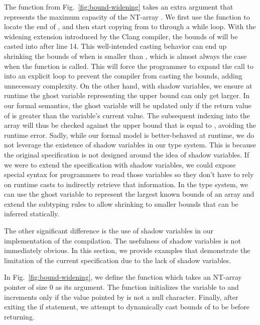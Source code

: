 The
  function from Fig.~\ref{fig:bound-widening}
 takes an extra argument  that represents the maximum capacity
 of the NT-array . We first use the  function to
 locate the end of , and then start copying from  to
  through a while loop. With the  widening
 extension introduced by the Clang \checkedc compiler, the bounds of
  will be casted into  after
 line 14. This well-intended casting behavior can end up shrinking the
bounds of  when  is smaller than ,
which is almost always the case when the 
function is called. This will force the programmer to expand the
call to  into an explicit  loop to prevent
the \checkedc compiler from casting the bounds, adding unnecessary
complexity. On the other hand, with shadow variables, we ensure at
runtime the ghost variable representing the upper bound can only get
larger. In our formal semantics, the
ghost variable will be updated only if the return value of  is
greater than the variable's current value. The subsequent indexing
into the array will thus be checked against the upper bound that is equal
to , avoiding the runtime error.
Sadly, while our formal model is better-behaved at runtime, we do not
leverage the existence of shadow variables in our type
system. This is because the original \checkedc specification is
not designed around the idea of shadow variables. If we were to extend the
specification with shadow variables, we could expose special syntax for
programmers to read those variables so they don't have to rely on
runtime casts to indirectly retrieve that information. In the type
system, we can use the ghost variable to represent the largest known
bounds of an array and extend the subtyping rules to allow shrinking
to smaller bounds that can be inferred statically. 

The other significant difference is the use of shadow variables in our implementation of the \checkedc compilation.
The usefulness of shadow variables is not immediately obvious. In
this section, we provide examples that demonstrate the limitation of the
current \checkedc specification due to the lack of shadow variables.

In Fig.~\ref{fig:bound-widening}, we define the function 
which takes an NT-array pointer of size $0$ as its argument. The
function initializes the variable  to  and
increments  only if the value pointed by  is not a
null character. Finally, after exiting the if statement, we attempt to
dynamically cast bounds of  to be  before
returning.


